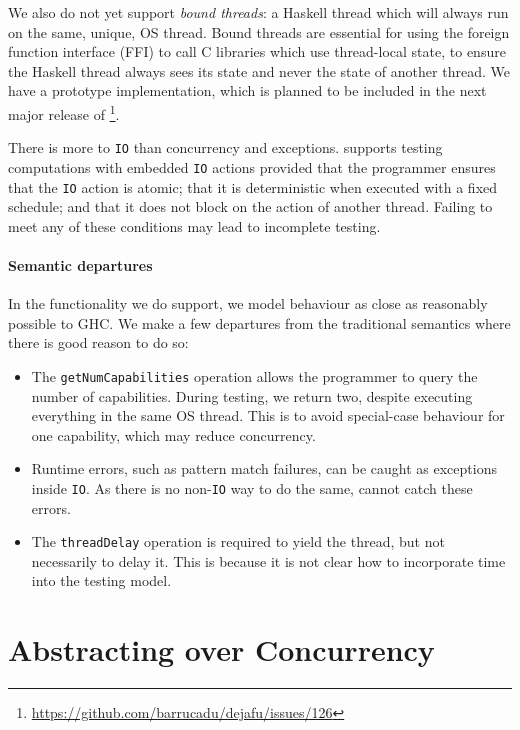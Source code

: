 We also do not yet support \emph{bound threads}: a Haskell thread
which will always run on the same, unique, OS thread.  Bound threads
are essential for using the foreign function interface (FFI) to call C
libraries which use thread-local state, to ensure the Haskell thread
always sees its state and never the state of another thread.  We have
a prototype implementation, which is planned to be included in the
next major release of
\dejafu{}\footnote{\url{https://github.com/barrucadu/dejafu/issues/126}}.

There is more to \verb|IO| than concurrency and exceptions.  \dejafu{} supports
testing computations with embedded \verb|IO| actions provided that the
programmer ensures that the \verb|IO| action is atomic; that it is deterministic
when executed with a fixed schedule; and that it does not block on the action of
another thread.  Failing to meet any of these conditions may lead to incomplete
testing.

\paragraph{Semantic departures}
In the functionality we do support, we model behaviour as close as
reasonably possible to GHC.  We make a few departures from the
traditional semantics where there is good reason to do so:

\begin{itemize}
\item The \verb|getNumCapabilities| operation allows the programmer to
  query the number of capabilities.  During testing, we return two,
  despite executing everything in the same OS thread.  This is to
  avoid special-case behaviour for one capability, which may reduce
  concurrency.
\item Runtime errors, such as pattern match failures, can be caught as
  exceptions inside \verb|IO|.  As there is no non-\verb|IO| way to do
  the same, \dejafu{} cannot catch these errors.
\item The \verb|threadDelay| operation is required to yield the
  thread, but not necessarily to delay it.  This is because it is not
  clear how to incorporate time into the testing model.
\end{itemize}

\section{Abstracting over Concurrency}
\label{sec:dejafu-monadconc}

